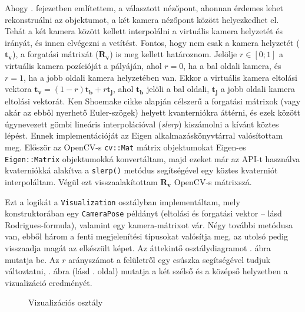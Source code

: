 Ahogy . fejezetben említettem, a választott nézőpont, ahonnan érdemes lehet rekonstruálni az objektumot, a két kamera nézőpont között helyezkedhet el. Tehát a két kamera között kellett interpolálni a virtuális kamera helyzetét és irányát, és innen elvégezni a vetítést. Fontos, hogy nem csak a kamera helyzetét ($\mathbf{t_v}$), a forgatási mátrixát ($\mathbf{R_v}$) is meg kellett határoznom. Jelölje $r \in [0; 1]$ a virtuális kamera pozícióját a pályáján, ahol $r = 0$, ha a bal oldali kamera, és $r = 1$, ha a jobb oldali kamera helyzetében van. Ekkor a virtuális kamera eltolási vektora $\mathbf{t_v} = (1-r)\mathbf{t_b} + r\mathbf{t_j}$, ahol $\mathbf{t_b}$ jelöli a bal oldali, $\mathbf{t_j}$ a jobb oldali kamera eltolási vektorát. Ken Shoemake cikke \cite{quaternion} alapján célszerű a forgatási mátrixok (vagy akár az ebből nyerhető Euler-szögek) helyett kvanterniókra áttérni, és ezek között úgynevezett gömbi lineáris interpolációval (\textit{slerp}) kiszámolni a kívánt köztes lépést. Ennek implementációját az Eigen \cite{eigenweb} alkalmazáskönyvtárral valósítottam meg. Először az OpenCV-s \texttt{cv::Mat} mátrix objektumokat Eigen-es \texttt{Eigen::Matrix} objektumokká konvertáltam, majd ezeket már az API-t használva kvaterniókká alakítva a \texttt{slerp()} metódus segítségével egy köztes kvaterniót interpoláltam. Végül ezt visszaalakítottam $\mathbf{R_v}$ OpenCV-s mátrixszá.

Ezt a logikát a \texttt{Visualization} osztályban implementáltam, mely konstruktorában egy \texttt{CameraPose} példányt (eltolási és forgatási vektor -- lásd Rodrigues-formula), valamint egy kamera-mátrixot vár. Négy további metódusa van, ebből három a fenti megjelenítési típusokat valósítja meg, az utolsó pedig visszaadja magát az elkészült képet. Az áttekintő osztálydiagramot . ábra mutatja be. Az $r$ arányszámot a felületről egy csúszka segítségével tudjuk változtatni, . ábra (lásd \pageref{fig:visu_slider}. oldal) mutatja a két szélső és a középső helyzetben a vizualizáció eredményét.

\begin{figure}[tbh]
\centering


\caption{Vizualizációs osztály \label{fig:cd:visualization}}
\end{figure}


